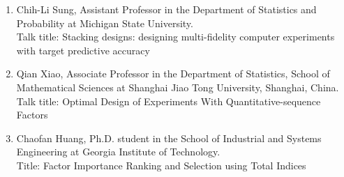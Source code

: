 \begin{session}
\begin{enumerate}
 \item Chih-Li Sung, Assistant Professor in the Department of Statistics and Probability at Michigan State University.\\
 Talk title: Stacking designs: designing multi-fidelity computer experiments with target predictive accuracy
 \item Qian Xiao, Associate Professor in the Department of Statistics, School of Mathematical Sciences at Shanghai Jiao Tong University, Shanghai, China. \\
 Talk title: Optimal Design of Experiments With Quantitative-sequence Factors
 \item Chaofan Huang, Ph.D. student in the School of Industrial and Systems Engineering at Georgia Institute of Technology. \\
 Title: Factor Importance Ranking and Selection using Total Indices
 \end{enumerate}
\end{session}



\clearpage


